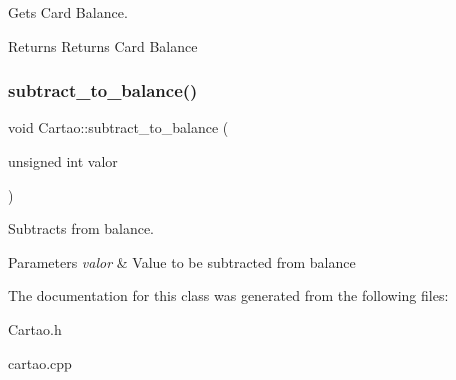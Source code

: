 Gets Card Balance. 

\begin{DoxyReturn}{Returns}
Returns Card Balance 
\end{DoxyReturn}
\mbox{\label{class_cartao_a08bc7512be9ea1ac77d94b8726720816}} 
\subsubsection{\texorpdfstring{subtract\+\_\+to\+\_\+balance()}{subtract\_to\_balance()}}
{\footnotesize\ttfamily void Cartao\+::subtract\+\_\+to\+\_\+balance (\begin{DoxyParamCaption}\item[{unsigned int}]{valor }\end{DoxyParamCaption})}



Subtracts from balance. 


\begin{DoxyParams}{Parameters}
{\em valor} & Value to be subtracted from balance \\
\hline
\end{DoxyParams}


The documentation for this class was generated from the following files\+:\begin{DoxyCompactItemize}
\item 
Cartao.\+h\item 
cartao.\+cpp\end{DoxyCompactItemize}
